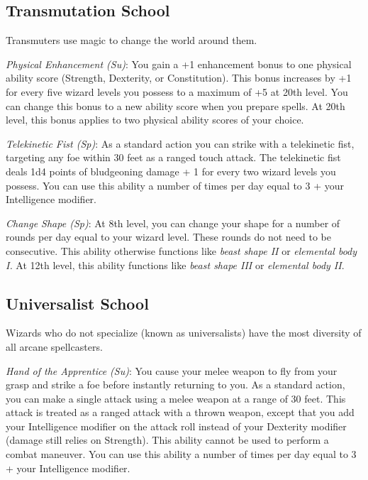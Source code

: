 \subsection{Transmutation School}

				
Transmuters use magic to change the world around them.
				
\textit{Physical Enhancement (Su)}: You gain a +1 enhancement bonus to one physical ability score (Strength, Dexterity, or Constitution). This bonus increases by +1 for every five wizard levels you possess to a maximum of +5 at 20th level. You can change this bonus to a new ability score when you prepare spells. At 20th level, this bonus applies to two physical ability scores of your choice.
				
\textit{Telekinetic Fist (Sp)}: As a standard action you can strike with a telekinetic fist, targeting any foe within 30 feet as a ranged touch attack. The telekinetic fist deals 1d4 points of bludgeoning damage + 1 for every two wizard levels you possess. You can use this ability a number of times per day equal to 3 + your Intelligence modifier.
				
\textit{Change Shape (Sp)}: At 8th level, you can change your shape for a number of rounds per day equal to your wizard level. These rounds do not need to be consecutive. This ability otherwise functions like \textit{beast shape II} or \textit{elemental body I.} At 12th level, this ability functions like \textit{beast shape III} or \textit{elemental body II}.
				
\subsection{Universalist School}

				
Wizards who do not specialize (known as universalists) have the most diversity of all arcane spellcasters.
				
\textit{Hand of the Apprentice (Su)}: You cause your melee weapon to fly from your grasp and strike a foe before instantly returning to you. As a standard action, you can make a single attack using a melee weapon at a range of 30 feet. This attack is treated as a ranged attack with a thrown weapon, except that you add your Intelligence modifier on the attack roll instead of your Dexterity modifier (damage still relies on Strength). This ability cannot be used to perform a combat maneuver. You can use this ability a number of times per day equal to 3 + your Intelligence modifier.
				
